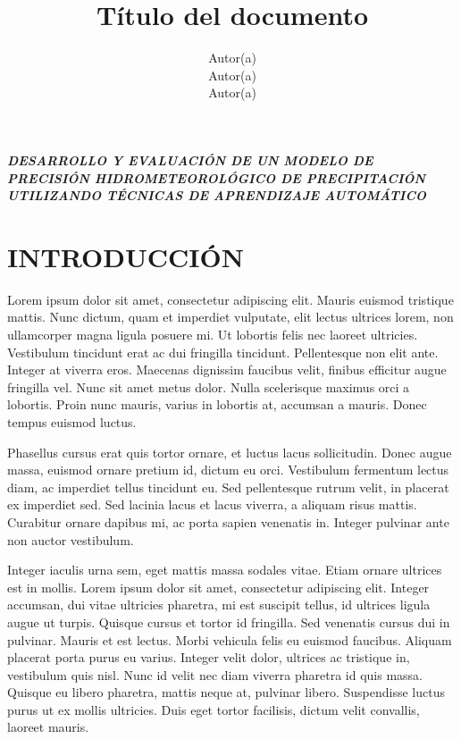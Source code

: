 \documentclass[stu, 12pt, helv, letterpaper, donotrepeattitle, floatsintext, natbib]{apa7}
\title{\Large Título del documento}
\author{Autor(a) \\Autor(a) \\Autor(a)} %
\affiliation{Nombre de la institución}
\begin{document}


\pagestyle{empty}

\begin{center}
{\large
\textbf{\textit{DESARROLLO Y EVALUACIÓN DE UN MODELO DE PRECISIÓN HIDROMETEOROLÓGICO DE PRECIPITACIÓN UTILIZANDO TÉCNICAS DE APRENDIZAJE AUTOMÁTICO\\}}}
\end{center}

\justify

\section*{INTRODUCCIÓN}

Lorem ipsum dolor sit amet, consectetur adipiscing elit. Mauris euismod tristique mattis. Nunc dictum, quam et imperdiet vulputate, elit lectus ultrices lorem, non ullamcorper magna ligula posuere mi. Ut lobortis felis nec laoreet ultricies. Vestibulum tincidunt erat ac dui fringilla tincidunt. Pellentesque non elit ante. Integer at viverra eros. Maecenas dignissim faucibus velit, finibus efficitur augue fringilla vel. Nunc sit amet metus dolor. Nulla scelerisque maximus orci a lobortis. Proin nunc mauris, varius in lobortis at, accumsan a mauris. Donec tempus euismod luctus.

Phasellus cursus erat quis tortor ornare, et luctus lacus sollicitudin. Donec augue massa, euismod ornare pretium id, dictum eu orci. Vestibulum fermentum lectus diam, ac imperdiet tellus tincidunt eu. Sed pellentesque rutrum velit, in placerat ex imperdiet sed. Sed lacinia lacus et lacus viverra, a aliquam risus mattis. Curabitur ornare dapibus mi, ac porta sapien venenatis in. Integer pulvinar ante non auctor vestibulum.

Integer iaculis urna sem, eget mattis massa sodales vitae. Etiam ornare ultrices est in mollis. Lorem ipsum dolor sit amet, consectetur adipiscing elit. Integer accumsan, dui vitae ultricies pharetra, mi est suscipit tellus, id ultrices ligula augue ut turpis. Quisque cursus et tortor id fringilla. Sed venenatis cursus dui in pulvinar. Mauris et est lectus. Morbi vehicula felis eu euismod faucibus. Aliquam placerat porta purus eu varius. Integer velit dolor, ultrices ac tristique in, vestibulum quis nisl. Nunc id velit nec diam viverra pharetra id quis massa. Quisque eu libero pharetra, mattis neque at, pulvinar libero. Suspendisse luctus purus ut ex mollis ultricies. Duis eget tortor facilisis, dictum velit convallis, laoreet mauris.
\end{document}
